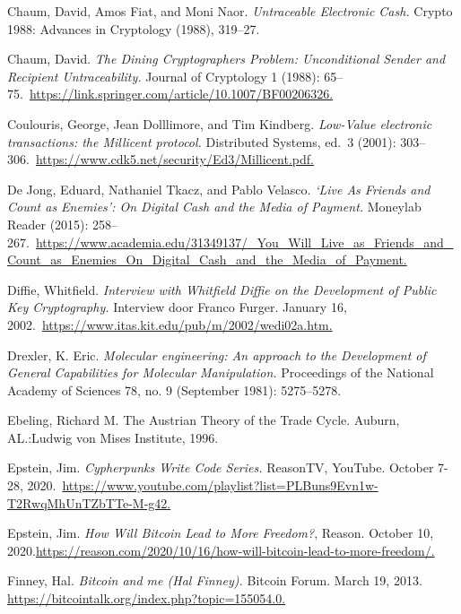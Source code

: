 \documentclass[smalldemyvopaper,11pt,twoside,onecolumn,openright,extrafontsizes,hidelinks]{memoir}
\begin{document}
Chaum, David, Amos Fiat, and Moni Naor. \emph{Untraceable Electronic
Cash.} Crypto 1988: Advances in Cryptology (1988), 319--27.

Chaum, David. \emph{The Dining Cryptographers Problem: Unconditional
Sender and Recipient Untraceability.} Journal of Cryptology 1 (1988):
65--75.~\href{https://link.springer.com/article/10.1007/BF00206326}{https://link.springer.com/article/10.1007/BF00206326.}

Coulouris, George, Jean Dolllimore, and Tim Kindberg. \emph{Low-Value
electronic transactions: the Millicent protocol.} Distributed Systems,
ed.~3 (2001):
303--306.~\href{https://www.cdk5.net/security/Ed3/Millicent.pdf}{https://www.cdk5.net/security/Ed3/Millicent.pdf.}

De Jong, Eduard, Nathaniel Tkacz, and Pablo Velasco. \emph{`Live As
Friends and Count as Enemies': On Digital Cash and the Media of
Payment.} Moneylab Reader (2015):
258--267.~\href{https://www.academia.edu/31349137/_You_Will_Live_as_Friends_and_Count_as_Enemies_On_Digital_Cash_and_the_Media_of_Payment}{https://www.academia.edu/31349137/\_You\_Will\_Live\_as\_Friends\_and\_Count\_as\_Enemies\_On\_Digital\_Cash\_and\_the\_Media\_of\_Payment.}

Diffie, Whitfield. \emph{Interview with Whitfield Diffie on the
Development of Public Key Cryptography.} Interview door Franco Furger.
January 16,
2002.~\href{https://www.itas.kit.edu/pub/m/2002/wedi02a.htm}{https://www.itas.kit.edu/pub/m/2002/wedi02a.htm.}

Drexler, K. Eric. \emph{Molecular engineering: An approach to the
Development of General Capabilities for Molecular Manipulation.}
Proceedings of the National Academy of Sciences 78, no. 9 (September
1981): 5275--5278.

Ebeling, Richard M. The Austrian Theory of the Trade Cycle. Auburn,
AL.:Ludwig von Mises Institute, 1996.

Epstein, Jim. \emph{Cypherpunks Write Code Series.} ReasonTV, YouTube.
October 7-28,
2020.~\href{https://www.youtube.com/playlist?list=PLBuns9Evn1w-T2RwqMhUnTZbTTe-M-g42}{https://www.youtube.com/playlist?list=PLBuns9Evn1w-T2RwqMhUnTZbTTe-M-g42.}

Epstein, Jim. \emph{How Will Bitcoin Lead to More Freedom?}, Reason.
October 10,
2020.\href{https://reason.com/2020/10/16/how-will-bitcoin-lead-to-more-freedom/}{https://reason.com/2020/10/16/how-will-bitcoin-lead-to-more-freedom/.}

Finney, Hal. \emph{Bitcoin and me (Hal Finney).} Bitcoin Forum. March
19, 2013.
\href{https://bitcointalk.org/index.php?topic=155054.0}{https://bitcointalk.org/index.php?topic=155054.0.}
\end{document}
